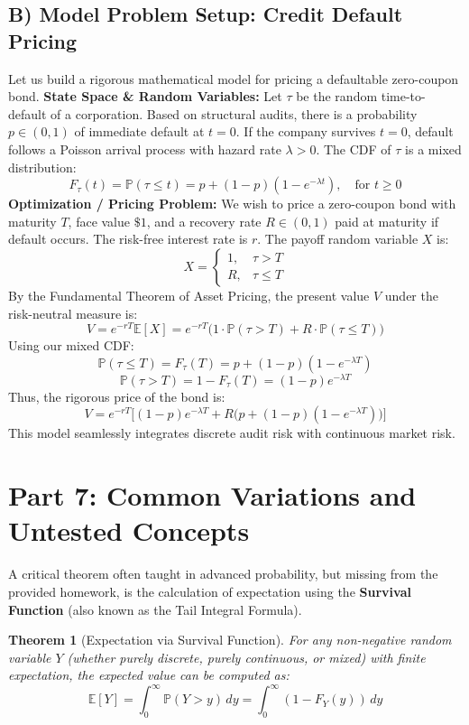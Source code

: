 \documentclass[11pt, a4paper]{article}
\newtheorem{theorem}{Theorem}[section]
\theoremstyle{definition}
\theoremstyle{remark}
\newcommand{\E}{\mathbb{E}}
\newcommand{\Prob}{\mathbb{P}}
\begin{document}
\subsection{B) Model Problem Setup: Credit Default Pricing}
Let us build a rigorous mathematical model for pricing a defaultable zero-coupon bond. 
\textbf{State Space \& Random Variables:} Let $\tau$ be the random time-to-default of a corporation. Based on structural audits, there is a probability $p \in (0,1)$ of immediate default at $t=0$. If the company survives $t=0$, default follows a Poisson arrival process with hazard rate $\lambda > 0$. 
The CDF of $\tau$ is a mixed distribution:
\[ F_\tau(t) = \Prob(\tau \le t) = p + (1-p)(1 - e^{-\lambda t}), \quad \text{for } t \ge 0 \]
\textbf{Optimization / Pricing Problem:} We wish to price a zero-coupon bond with maturity $T$, face value $\$1$, and a recovery rate $R \in (0,1)$ paid at maturity if default occurs. The risk-free interest rate is $r$. The payoff random variable $X$ is:
\[ X = \begin{cases} 1, & \tau > T \\ R, & \tau \le T \end{cases} \]
By the Fundamental Theorem of Asset Pricing, the present value $V$ under the risk-neutral measure is:
\[ V = e^{-rT} \E[X] = e^{-rT} \Big( 1 \cdot \Prob(\tau > T) + R \cdot \Prob(\tau \le T) \Big) \]
Using our mixed CDF:
\[ \Prob(\tau \le T) = F_\tau(T) = p + (1-p)(1 - e^{-\lambda T}) \]
\[ \Prob(\tau > T) = 1 - F_\tau(T) = (1-p)e^{-\lambda T} \]
Thus, the rigorous price of the bond is:
\[ V = e^{-rT} \Big[ (1-p)e^{-\lambda T} + R \big( p + (1-p)(1 - e^{-\lambda T}) \big) \Big] \]
This model seamlessly integrates discrete audit risk with continuous market risk.

\newpage
\section{Part 7: Common Variations and Untested Concepts}

A critical theorem often taught in advanced probability, but missing from the provided homework, is the calculation of expectation using the \textbf{Survival Function} (also known as the Tail Integral Formula). 

\begin{theorem}[Expectation via Survival Function]
For any non-negative random variable $Y$ (whether purely discrete, purely continuous, or mixed) with finite expectation, the expected value can be computed as:
\[ \E[Y] = \int_{0}^{\infty} \Prob(Y > y) \, dy = \int_{0}^{\infty} (1 - F_Y(y)) \, dy \]
\end{theorem}
\end{document}
